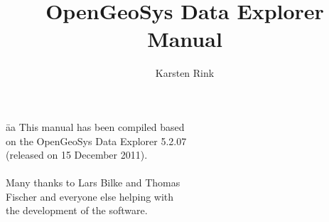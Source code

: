 \documentclass[11pt,twoside,a4paper]{book}
\title{{\LARGE OpenGeoSys Data Explorer}\\[0.5em] Manual}
\author{Karsten Rink}
\newcommand{\ogs}{OpenGeoSys }
\begin{document}
\pagestyle{empty}
\maketitle
\newpage

\vspace*{16cm}
\begin{tabbing}

\hspace*{14cm}\=aa\kill
\noindent This manual has been compiled based \> \\on the \ogs Data Explorer 5.2.07 \> \\(released on 15 December 2011). \> \\
\> \\
\noindent Many thanks to Lars Bilke and Thomas \> \\ Fischer and everyone else helping with \> \\ the development of the software. \> \\
\end{tabbing}

\newpage

\tableofcontents

\cleardoublepage

\pagestyle{fancy}









\appendix

\cleardoublepage
{}
\printindex

\cleardoublepage


\cleardoublepage
\end{document}
